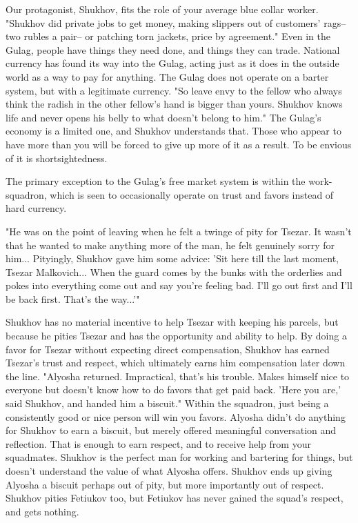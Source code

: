 \documentclass[12pt]{article}
\begin{document}
\begin{flushleft}
Our protagonist, Shukhov, fits the role of your average blue collar worker.
"Shukhov did private jobs to get money, making slippers out of customers' rags-- two rubles a pair-- or patching torn jackets, price by agreement."\footnotemark
Even in the Gulag, people have things they need done, and things they can trade. 
National currency has found its way into the Gulag, acting just as it does in the outside world as a way to pay for anything. The Gulag does not operate on a barter system, but with a legitimate currency.
"So leave envy to the fellow who always think the radish in the other fellow's hand is bigger than yours. Shukhov knows life and never opens his belly to what doesn't belong to him."\footnotemark
The Gulag's economy is a limited one, and Shukhov understands that. 
Those who appear to have more than you will be forced to give up more of it as a result. To be envious of it is shortsightedness. 

The primary exception to the Gulag's free market system is within the work-squadron, which is seen to occasionally operate on trust and favors instead of hard currency.


\begin{center}
"He was on the point of leaving when he felt a twinge of pity for Tsezar. 
It wasn't that he wanted to make anything more of the man, he felt genuinely sorry for him... Pityingly, Shukhov gave him some advice: 
'Sit here till the last moment, Tsezar Malkovich... 
When the guard comes by the bunks with the orderlies and pokes into everything come out and say you're feeling bad. 
I'll go out first and I'll be back first. That's the way...'"\footnotemark
\end{center}

Shukhov has no material incentive to help Tsezar with keeping his parcels, but because he pities Tsezar and has the opportunity and ability to help.
By doing a favor for Tsezar without expecting direct compensation, Shukhov has earned Tsezar's trust and respect, which ultimately earns him compensation later down the line. 
"Alyosha returned. Impractical, that's his trouble. Makes himself nice to everyone but doesn't know how to do favors that get paid back. 'Here you are,' said Shukhov, and handed him a biscuit."\footnotemark
Within the squadron, just being a consistently good or nice person will win you favors. Alyosha didn't do anything for Shukhov to earn a biscuit, but merely offered meaningful conversation and reflection. That is enough to earn respect, and to receive help from your squadmates.
Shukhov is the perfect man for working and bartering for things, but doesn't understand the value of what Alyosha offers. Shukhov ends up giving Alyosha a biscuit perhaps out of pity, but more importantly out of respect. Shukhov pities Fetiukov too, but Fetiukov has never gained the squad's respect, and gets nothing.



\end{flushleft}
\end{document}
